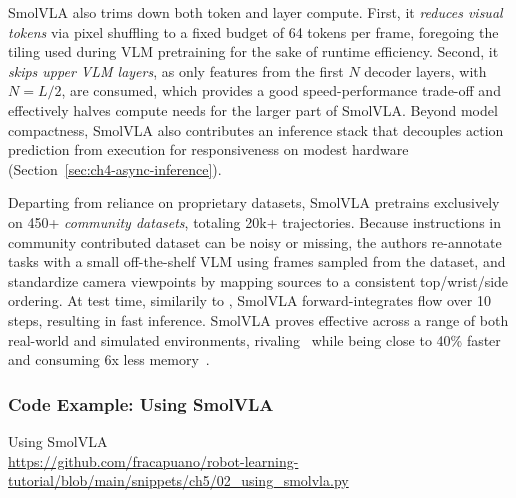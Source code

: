 SmolVLA also trims down both token and layer compute.
First, it \emph{reduces visual tokens} via pixel shuffling to a fixed budget of 64 tokens per frame, foregoing the tiling used during VLM pretraining for the sake of runtime efficiency. 
Second, it \emph{skips upper VLM layers}, as only features from the first \(N\) decoder layers, with \(N=L/2\), are consumed, which provides a good speed-performance trade-off and effectively halves compute needs for the larger part of SmolVLA.
Beyond model compactness, SmolVLA also contributes an inference stack that decouples action prediction from execution for responsiveness on modest hardware (Section~\ref{sec:ch4-async-inference}).

Departing from reliance on proprietary datasets, SmolVLA pretrains exclusively on 450+ \emph{community datasets}, totaling 20k+ trajectories. 
Because instructions in community contributed dataset can be noisy or missing, the authors re-annotate tasks with a small off-the-shelf VLM using frames sampled from the dataset, and standardize camera viewpoints by mapping sources to a consistent top/wrist/side ordering.
At test time, similarily to \pizero, SmolVLA forward-integrates flow over 10 steps, resulting in fast inference.
SmolVLA proves effective across a range of both real-world and simulated environments, rivaling \pizero~while being close to 40\% faster and consuming 6x less memory~\citep{shukorSmolVLAVisionLanguageActionModel2025}.

\subsubsection{Code Example: Using SmolVLA}
\begin{pbox}[label={ex:using-smolvla}]{Using SmolVLA \\ \url{https://github.com/fracapuano/robot-learning-tutorial/blob/main/snippets/ch5/02_using_smolvla.py}}
    
\end{pbox}
